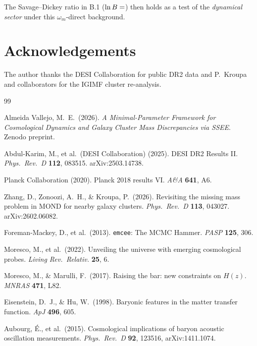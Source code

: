 \documentclass[12pt,a4paper]{article}
\begin{document}
The Savage--Dickey ratio in B.1
($\ln B=\val{p2_lnB_signo}$) then holds as a test of the \emph{dynamical sector} under this
$\omega_m$-direct background.

\section*{Acknowledgements}
The author thanks the DESI Collaboration for public DR2 data and
P.~Kroupa and collaborators for the IGIMF cluster re-analysis.

\clearpage

\begin{thebibliography}{99}

Almeida Vallejo, M.~E.\ (2026).
\textit{A Minimal-Parameter Framework for Cosmological Dynamics and
Galaxy Cluster Mass Discrepancies via SSEE}. Zenodo preprint.

Abdul-Karim, M., et al.\ (DESI Collaboration) (2025).
DESI DR2 Results II.
\textit{Phys.\ Rev.\ D} \textbf{112}, 083515. arXiv:2503.14738.

Planck Collaboration (2020).
Planck 2018 results VI.
\textit{A\&A} \textbf{641}, A6.

Zhang, D., Zonoozi, A.~H., \& Kroupa, P.\ (2026).
Revisiting the missing mass problem in MOND for nearby galaxy clusters.
\textit{Phys.\ Rev.\ D} \textbf{113}, 043027. arXiv:2602.06082.

Foreman-Mackey, D., et al.\ (2013).
\texttt{emcee}: The MCMC Hammer.
\textit{PASP} \textbf{125}, 306.

Moresco, M., et al.\ (2022).
Unveiling the universe with emerging cosmological probes.
\textit{Living Rev.\ Relativ.} \textbf{25}, 6.

Moresco, M., \& Marulli, F.\ (2017).
Raising the bar: new constraints on $H(z)$.
\textit{MNRAS} \textbf{471}, L82.

Eisenstein, D.~J., \& Hu, W.\ (1998).
Baryonic features in the matter transfer function.
\textit{ApJ} \textbf{496}, 605.

Aubourg, \'E., et al.\ (2015).
Cosmological implications of baryon acoustic oscillation measurements.
\textit{Phys.\ Rev.\ D} \textbf{92}, 123516, arXiv:1411.1074.


\end{thebibliography}
\end{document}
